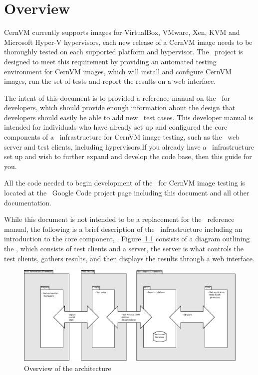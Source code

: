 \chapter{Overview}
\label{sec:overview}

CernVM currently supports images for VirtualBox, VMware, Xen, KVM and Microsoft Hyper-V hypervisors, each new release of a CernVM image needs to be 
thoroughly tested on each supported platform and hypervisor. The \cernvmreleasetesting\ project is designed to meet this requirement by providing an 
automated testing environment for CernVM images, which will install and configure CernVM images, run the set of tests and report the results on a web
interface.

The intent of this document is to provided a reference manual on the \cernvmtestframework\ for developers, which should provide enough information 
about the design that developers should easily be able to add new \cernvmreleasetesting\ test cases. This developer manual is intended for individuals
who have already set up and configured the core components of a \releasetesting\ infrastructure for CernVM image testing, such as the \amdtapper\
web server and test clients, including hypervisors.If you already have a \cernvmreleasetesting\ infrastructure set up and wish to further expand
and develop the code base, then this guide for you.

All the code needed to begin development of the \cernvmtestframework\ for CernVM image testing is located at the \cernvmreleasetesting\ Google 
Code project page\cite{GCreleasetesting} including this document and all other documentation. 

While this document is not intended to be a replacement for the \amdtapper\ reference manual, the following is a brief description of the
\releasetesting\ infrastructure including an introduction to the core component, \amdtapper\cite{tapper}. Figure~\ref{fig:architecture} 
consists of a diagram outlining the \indexed{\tapper~Architecture}, which consists of test clients and a server, the server is what 
controls the test clients, gathers results, and then displays the results through a web interface.

\begin{figure}[hbp]
	\begin{center}
		\includegraphics[scale=0.25]{img/tapper_architecture_overview.png}
	\end{center}
	\caption{Overview of the \tapper architecture}
	\label{fig:architecture}
\end{figure}

